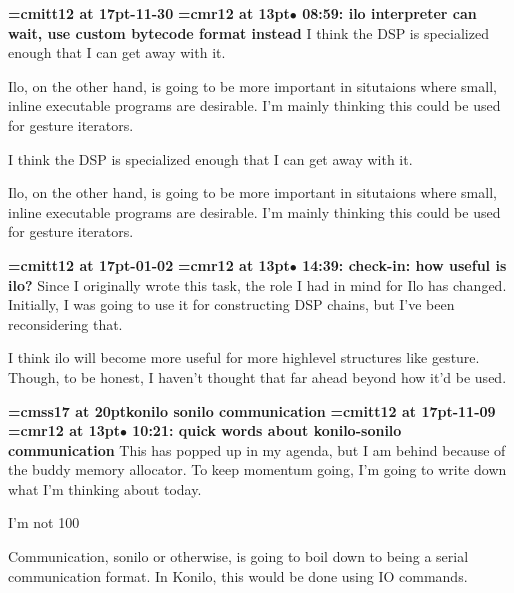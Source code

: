 {\medskip\noindent\bf\font\titlefont=cmitt12 at 17pt-11-30}\medskip
{\smallskip\noindent\bf\font\titlefont=cmr12 at 13pt\titlefont $\bullet$ 08:59: ilo interpreter can wait, use custom bytecode format instead}\smallskip
I think the DSP is specialized enough that I can get away with it.
\par

Ilo, on the other hand, is going to be more important in situtaions where small, inline executable programs are desirable. I'm mainly thinking this could be used for  gesture iterators.
\par

I think the DSP is specialized enough that I can get away with it.
\par

Ilo, on the other hand, is going to be more important in situtaions where small, inline executable programs are desirable. I'm mainly thinking this could be used for  gesture iterators.
\par

{\medskip\noindent\bf\font\titlefont=cmitt12 at 17pt-01-02}\medskip
{\smallskip\noindent\bf\font\titlefont=cmr12 at 13pt\titlefont $\bullet$ 14:39: check-in: how useful is ilo?}\smallskip
Since I originally wrote this task, the role I had in mind for Ilo has changed. Initially, I was going to use it for constructing DSP chains, but I've been reconsidering that.
\par

I think ilo will become more useful for more highlevel structures like gesture. Though, to be honest, I haven't thought that far ahead beyond how it'd be used.
\par

{\medskip\noindent\bf\font\titlefont=cmss17 at 20pt\titlefont konilo sonilo communication}\medskip
{\medskip\noindent\bf\font\titlefont=cmitt12 at 17pt-11-09}\medskip
{\smallskip\noindent\bf\font\titlefont=cmr12 at 13pt\titlefont $\bullet$ 10:21: quick words about konilo-sonilo communication}\smallskip
This has popped up in my agenda, but I am behind because of the buddy memory allocator. To keep momentum going, I'm going to write down what I'm thinking about today.
\par

I'm not 100%
\par

Communication, sonilo or otherwise, is going to boil down to being a serial communication format. In Konilo, this would be done using IO commands.
\par

